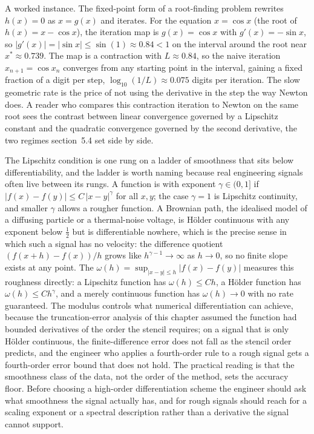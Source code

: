 A worked instance. The fixed-point form of a root-finding problem
rewrites $h(x) = 0$ as $x = g(x)$ and iterates. For the equation
$x = \cos x$ (the root of $h(x) = x - \cos x$), the iteration map is
$g(x) = \cos x$ with $g'(x) = -\sin x$, so $|g'(x)| = |\sin x| \leq
\sin(1) \approx 0.84 < 1$ on the interval around the root near
$x^{*} \approx 0.739$. The map is a contraction with $L \approx 0.84$,
so the naive iteration $x_{n+1} = \cos x_{n}$ converges from any
starting point in the interval, gaining a fixed fraction of a digit per
step, $\log_{10}(1/L) \approx 0.075$ digits per iteration. The slow
geometric rate is the price of not using the derivative in the step the
way Newton does. A reader who compares this contraction iteration to
Newton on the same root sees the contrast between linear convergence
governed by a Lipschitz constant and the quadratic convergence governed
by the second derivative, the two regimes section~5.4 set side by side.

\begin{mastery}
The Lipschitz condition is one rung on a ladder of smoothness that
sits below differentiability, and the ladder is worth naming because
real engineering signals often live between its rungs. A function is
 with exponent $\gamma \in (0, 1]$ if
$|f(x) - f(y)| \le C\,|x - y|^{\gamma}$ for all $x, y$; the case
$\gamma = 1$ is Lipschitz continuity, and smaller $\gamma$ allows a
rougher function. A Brownian path, the idealised model of a diffusing
particle or a thermal-noise voltage, is H\"older continuous with any
exponent below $\tfrac{1}{2}$ but is differentiable nowhere, which is
the precise sense in which such a signal has no velocity: the
difference quotient $(f(x+h) - f(x))/h$ grows like $h^{\gamma - 1} \to
\infty$ as $h \to 0$, so no finite slope exists at any point. The
 $\omega(h) = \sup_{|x - y| \le h}
|f(x) - f(y)|$ measures this roughness directly: a Lipschitz function
has $\omega(h) \le Ch$, a H\"older function has $\omega(h) \le
Ch^{\gamma}$, and a merely continuous function has $\omega(h) \to 0$
with no rate guaranteed. The modulus controls what numerical
differentiation can achieve, because the truncation-error analysis of
this chapter assumed the function had bounded derivatives of the
order the stencil requires; on a signal that is only H\"older
continuous, the finite-difference error does not fall as the stencil
order predicts, and the engineer who applies a fourth-order rule to a
rough signal gets a fourth-order error bound that does not hold. The
practical reading is that the smoothness class of the data, not the
order of the method, sets the accuracy floor. Before choosing a
high-order differentiation scheme the engineer should ask what
smoothness the signal actually has, and for rough signals should
reach for a scaling exponent or a spectral description rather than a
derivative the signal cannot support.
\end{mastery}

